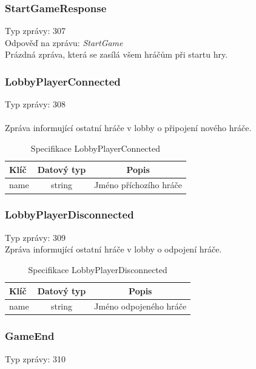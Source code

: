 \documentclass[12pt, a4paper]{article}
\begin{document}
    \subsubsection*{StartGameResponse}
    Typ zprávy: 307\\
    Odpověď na zprávu: \textit{StartGame}\\

    Prázdná zpráva, která se zasílá všem hráčům při startu hry.

    \subsubsection*{LobbyPlayerConnected}
    Typ zprávy: 308\\\\
    Zpráva informující ostatní hráče v lobby o připojení nového hráče.

    \begin{table}[H]
        \centering
        \begin{tabular}{|l|c|c|}
            \hline
            Klíč & Datový typ & Popis\\
            \hline
            \hline
            name & string & Jméno příchozího hráče\\
            \hline
        \end{tabular}
        \caption{Specifikace LobbyPlayerConnected}
    \end{table}

    \subsubsection*{LobbyPlayerDisconnected}
    Typ zprávy: 309\\

    Zpráva informující ostatní hráče v lobby o odpojení hráče.

    \begin{table}[H]
        \centering
        \begin{tabular}{|l|c|c|}
            \hline
            Klíč & Datový typ & Popis\\
            \hline
            \hline
            name & string & Jméno odpojeného hráče\\
            \hline
        \end{tabular}
        \caption{Specifikace LobbyPlayerDisconnected}
    \end{table}

    \subsubsection*{GameEnd}
    Typ zprávy: 310\\
\end{document}
